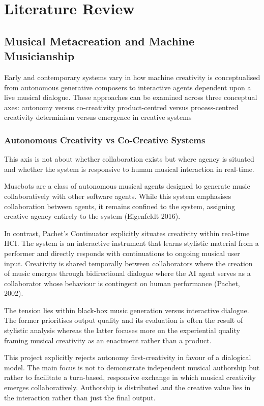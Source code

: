 \documentclass[11pt,a4paper]{article}
\begin{document}
\section{Literature Review}

\subsection{Musical Metacreation and Machine Musicianship}
Early and contemporary systems vary in how machine creativity is conceptualised from autonomous generative composers to interactive agents dependent upon a live musical dialogue. These approaches can be examined across three conceptual axes: 
autonomy versus co-creativity
product-centred versus process-centred creativity
determinism versus emergence in creative systems

\subsubsection{Autonomous Creativity vs Co-Creative Systems}
This axis is not about whether collaboration exists but where agency is situated and whether the system is responsive to human musical interaction in real-time.

Musebots are a class of autonomous musical agents designed to generate music collaboratively with other software agents. While this system emphasises collaboration between agents, it remains confined to the system, assigning creative agency entirely to the system (Eigenfeldt 2016). 

In contrast, Pachet’s Continuator explicitly situates creativity within real-time HCI. The system is an interactive instrument that learns stylistic material from a performer and directly responds with continuations to ongoing musical user input. Creativity is shared temporally between collaborators where the creation of music emerges through bidirectional dialogue where the AI agent serves as a collaborator whose behaviour is contingent on human performance (Pachet, 2002).

The tension lies within black-box music generation versus interactive dialogue. The former prioritises output quality and its evaluation is often the result of stylistic analysis whereas the latter focuses more on the experiential quality framing musical creativity as an enactment rather than a product. 

This project explicitly rejects autonomy first-creativity in favour of a dialogical model. The main focus is not to demonstrate independent musical authorship but rather to facilitate a turn-based, responsive exchange in which musical creativity emerges collaboratively. Authorship is distributed and the creative value lies in the interaction rather than just the final output.
\end{document}
